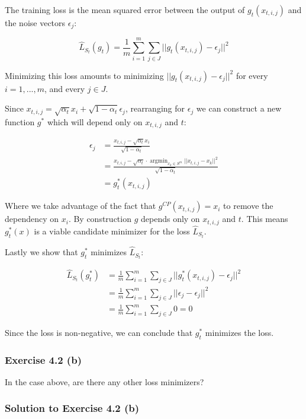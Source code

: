 \documentclass[
10pt, %
a4paper, %
oneside, %
headinclude,footinclude, %
BCOR5mm, %
]{scrartcl}
\DeclareMathOperator*{\argmin}{argmin} %
\begin{document}
The training loss is the mean squared error between the output of $g_t(x_{t,i,j})$ and the noise vectors $\epsilon_j$:

\begin{equation*}
  \hat{L}_{S_t}(g_t) = \frac{1}{m} \sum_{i=1}^{m} \sum_{j \in J} ||g_t (x_{t,i,j} ) - \epsilon_j ||^2
\end{equation*}

Minimizing this loss amounts to minimizing $||g_t (x_{t,i,j})-\epsilon_j||^2$ for every $i = 1, ..., m$, and every $j \in J$.

Since $x_{t,i,j} = \sqrt{\alpha_t}x_i + \sqrt{1-\alpha_t}\epsilon_j$, rearranging for $\epsilon_j$ we can construct a new function $g^*$ which will depend only on $x_{t,i,j}$ and $t$:

\begin{align*}
  \epsilon_j &= \frac{x_{t,i,j} - \sqrt{\alpha_t}x_i}{\sqrt{1-\alpha_t}} \\
   &= \frac{x_{t,i,j} - \sqrt{\alpha_t} \cdot \argmin_{x_k \in S^m} ||x_{t,i,j}-x_k||^2}{\sqrt{1-\alpha_t}} \\
  &= g^*_t(x_{t,i,j})
\end{align*}

Where we take advantage of the fact that $g^{CP}(x_{t,i,j}) = x_i$ to remove the dependency on $x_i$. By construction $g$ depends only on $x_{t,i,j}$ and $t$. This means $g^*_t(x)$ is a viable candidate minimizer for the loss $\hat{L}_{S_t}$.

Lastly we show that $g^*_t$ minimizes $\hat{L}_{S_t}$:

\begin{align*}
  \hat{L}_{S_t}(g^*_t) &= \frac{1}{m} \sum_{i=1}^{m} \sum_{j \in J} ||g^*_t (x_{t,i,j} ) - \epsilon_j ||^2 \\
  &= \frac{1}{m} \sum_{i=1}^{m} \sum_{j \in J} ||\epsilon_j - \epsilon_j ||^2 \\
  &= \frac{1}{m} \sum_{i=1}^{m} \sum_{j \in J} 0 = 0
\end{align*}

Since the loss is non-negative, we can conclude that $g^*_t$ minimizes the loss.

\subsubsection*{Exercise 4.2 (b)}
In the case above, are there any other loss minimizers?

\subsubsection*{Solution to Exercise 4.2 (b)}
\end{document}
